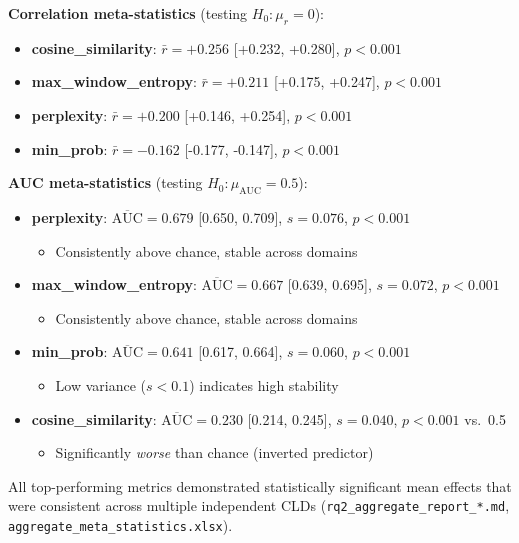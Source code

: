 \textbf{Correlation meta-statistics} (testing \(H_0: \mu_r = 0\)):
\begin{itemize}
    \item \textbf{cosine\_similarity}: \(\bar{r} = +0.256\) [+0.232, +0.280], \(p < 0.001\)
    \item \textbf{max\_window\_entropy}: \(\bar{r} = +0.211\) [+0.175, +0.247], \(p < 0.001\)
    \item \textbf{perplexity}: \(\bar{r} = +0.200\) [+0.146, +0.254], \(p < 0.001\)
    \item \textbf{min\_prob}: \(\bar{r} = -0.162\) [-0.177, -0.147], \(p < 0.001\)
\end{itemize}

\textbf{AUC meta-statistics} (testing \(H_0: \mu_{\text{AUC}} = 0.5\)):
\begin{itemize}
    \item \textbf{perplexity}: \(\overline{\text{AUC}} = 0.679\) [0.650, 0.709], \(s = 0.076\), \(p < 0.001\)
    \begin{itemize}
        \item Consistently above chance, stable across domains
    \end{itemize}
    \item \textbf{max\_window\_entropy}: \(\overline{\text{AUC}} = 0.667\) [0.639, 0.695], \(s = 0.072\), \(p < 0.001\)
    \begin{itemize}
        \item Consistently above chance, stable across domains
    \end{itemize}
    \item \textbf{min\_prob}: \(\overline{\text{AUC}} = 0.641\) [0.617, 0.664], \(s = 0.060\), \(p < 0.001\)
    \begin{itemize}
        \item Low variance (\(s < 0.1\)) indicates high stability
    \end{itemize}
    \item \textbf{cosine\_similarity}: \(\overline{\text{AUC}} = 0.230\) [0.214, 0.245], \(s = 0.040\), \(p < 0.001\) vs.\ 0.5
    \begin{itemize}
        \item Significantly \textit{worse} than chance (inverted predictor)
    \end{itemize}
\end{itemize}

All top-performing metrics demonstrated statistically significant mean effects that were consistent across multiple independent CLDs (\texttt{rq2\_aggregate\_report\_*.md}, \texttt{aggregate\_meta\_statistics.xlsx}).

